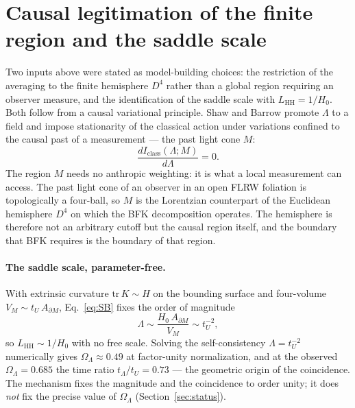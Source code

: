 \documentclass[11pt,a4paper]{article}
\theoremstyle{plain}
\theoremstyle{definition}
\theoremstyle{remark}
\newcommand{\OL}{\Omega_\Lambda}
\begin{document}
\section{Causal legitimation of the finite region and the saddle scale}
\label{sec:causal}

Two inputs above were stated as model-building choices: the restriction of the averaging to the
finite hemisphere $D^4$ rather than a global region requiring an observer measure, and the
identification of the saddle scale with $L_{\mathrm{HH}} = 1/H_0$. Both follow from a causal
variational principle. Shaw and Barrow \cite{ShawBarrow2011} promote $\Lambda$ to a field and
impose stationarity of the classical action under variations confined to the causal past of a
measurement --- the past light cone $M$:
\begin{equation}
\label{eq:SB}
\frac{dI_{\mathrm{class}}(\Lambda; M)}{d\Lambda} = 0 .
\end{equation}
The region $M$ needs no anthropic weighting: it is what a local measurement can access. The past
light cone of an observer in an open FLRW foliation is topologically a four-ball, so $M$ is the
Lorentzian counterpart of the Euclidean hemisphere $D^4$ on which the BFK decomposition operates.
The hemisphere is therefore not an arbitrary cutoff but the causal region itself, and the
boundary that BFK requires is the boundary of that region.

\paragraph{The saddle scale, parameter-free.} With extrinsic curvature $\mathrm{tr}\,K \sim H$ on
the bounding surface and four-volume $V_M \sim t_U\,A_{\partial M}$, Eq.~\eqref{eq:SB} fixes the
order of magnitude
\begin{equation}
\Lambda \sim \frac{H_0\,A_{\partial M}}{V_M} \sim t_U^{-2},
\end{equation}
so $L_{\mathrm{HH}} \sim 1/H_0$ with no free scale. Solving the self-consistency
$\Lambda = t_U^{-2}$ numerically gives $\OL \approx 0.49$ at factor-unity normalization, and at
the observed $\OL = 0.685$ the time ratio $t_\Lambda/t_U = 0.73$ --- the geometric origin of the
coincidence. The mechanism fixes the magnitude and the coincidence to order unity; it does
\emph{not} fix the precise value of $\OL$ (Section~\ref{sec:status}).
\end{document}
